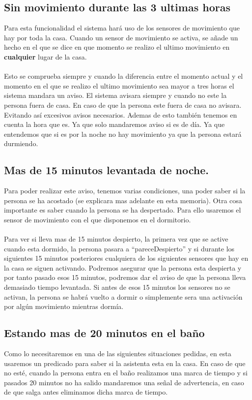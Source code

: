 \documentclass[12pt,a4paper]{article}
\begin{document}
\subsection{Sin movimiento durante las 3 ultimas horas}
Para esta funcionalidad el sistema hará uso de los sensores de movimiento que hay por toda la casa. Cuando un sensor de movimiento se activa, se añade un hecho en el que se dice en que momento se realizo el ultimo movimiento en \textbf{cualquier} lugar de la casa.
\\\\
Esto se comprueba siempre y cuando la diferencia entre el momento actual y el momento en el que se realizo el ultimo movimiento sea mayor a tres horas el sistema mandara un aviso. El sistema avisara siempre y cuando no este la persona fuera de casa. En caso de que la persona este fuera de casa no avisara. Evitando así excesivos avisos necesarios. Ademas de esto también tenemos en cuenta la hora que es. Ya que solo mandaremos aviso si es de día. Ya que entendemos que si es por la noche no hay movimiento ya que la persona estará durmiendo. 
\subsection{Mas de 15 minutos levantada de noche.}
Para poder realizar este aviso, tenemos varias condiciones, una poder saber si la persona se ha acostado (se explicara mas adelante en esta memoria). Otra cosa importante es saber cuando la persona se ha despertado. Para ello usaremos el sensor de movimiento con el que disponemos en el dormitorio.\\\\
Para ver si lleva mas de 15 minutos despierto, la primera vez que se active cuando esta dormido, la persona pasara a ``pareceDespierto'' y si durante los siguientes 15 minutos posteriores cualquiera de los siguientes sensores que hay en la casa se siguen activando. Podremos asegurar que la persona esta despierta y por tanto pasado esos 15 minutos, podremos dar el aviso de que la persona lleva demasiado tiempo levantada. Si antes de esos 15 minutos los sensores no se activan, la persona se habrá vuelto a dormir o simplemente sera una activación por algún movimiento mientras dormía.
\subsection{Estando mas de 20 minutos en el baño}
Como lo necesitaremos en una de las siguientes situaciones pedidas, en esta usaremos un predicado para saber si la asistenta esta en la casa. En caso de que no esté, cuando la persona entra en el baño realizamos una marca de tiempo y si pasados 20 minutos no ha salido mandaremos una señal de advertencia, en caso de que salga antes eliminamos dicha marca de tiempo. 
\end{document}
